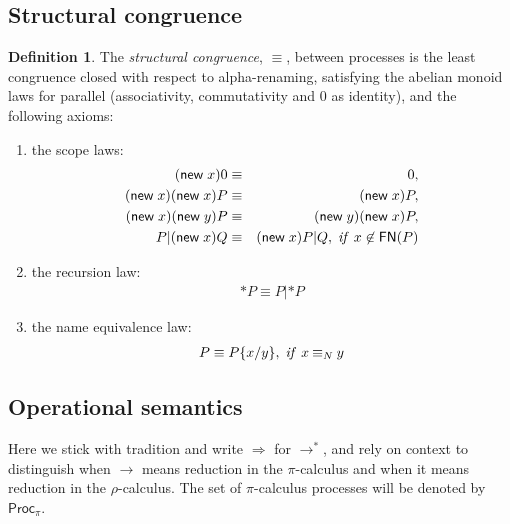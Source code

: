 \documentclass[submission,copyright,creativecommons]{eptcs}
\newcommand{\pic}{$\pi$-calculus}
\newcommand{\pzero}{\mathbin{0}}
\newcommand{\scong}{\mathbin{\equiv}}
\newcommand{\nameeq}{\mathbin{\equiv_N}}
\newcommand{\freenames}[1]{\mathbin{\mathsf{FN}(#1)}}
\newcommand{\substn}[2]{\{ #1 / #2 \}}
\newcommand{\Proc}{\mathsf{Proc}}
\newcommand{\red}{\rightarrow}
\newcommand{\wred}{\Rightarrow}
\newcommand{\rhoc}{$\rho$-calculus}
\theoremstyle{definition}
\newtheorem{definition}{Definition}
\theoremstyle{remark}
\theoremstyle{remark}
\begin{document}
\subsection{Structural congruence}

\begin{definition}
The {\em structural congruence}, $\equiv$, between processes is 
the least congruence closed with respect to
alpha-renaming, satisfying the abelian monoid laws for 
parallel (associativity, commutativity and $\pzero$ 
as identity), and the following axioms:
\begin{enumerate}
\item the scope laws:
\begin{eqnarray*}
 (\mathsf{new}\;x)\pzero & \equiv & \pzero, \\
 (\mathsf{new}\;x)(\mathsf{new}\;x)P & \equiv & (\mathsf{new}\;x)P, \\
 (\mathsf{new}\;x)(\mathsf{new}\;y)P & \equiv & (\mathsf{new}\;y)(\mathsf{new}\;x)P, \\
 P|(\mathsf{new}\;x)Q & \equiv & (\mathsf{new}\;x)P|Q, \; \mbox{\textit{if} }x \not\in \freenames{P} 
\end{eqnarray*}
\item
the recursion law:
\begin{eqnarray*}
 \mathsf{*}P \equiv P|\mathsf{*}P
\end{eqnarray*}
\item
the name equivalence law:
\begin{eqnarray*}
 P \equiv P \substn{x}{y}, \; \mbox{\textit{if} }x \nameeq y
\end{eqnarray*}
\end{enumerate}
\end{definition}

\subsection{Operational semantics} 



Here we stick with tradition and write $\wred$ for $\red^*$, and rely
on context to distinguish when $\red$ means reduction in the {\pic}
and when it means reduction in the {\rhoc}. The set of {\pic}
processes will be denoted by $\Proc_{\pi}$.
\end{document}

